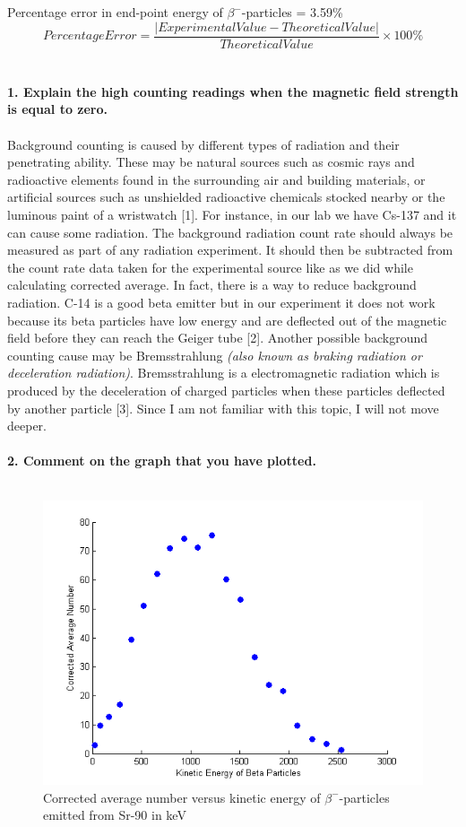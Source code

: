 \documentclass[a4paper,12pt]{article}
\begin{document}
Percentage error in end-point energy of $\beta^{-}$-particles = 3.59\% \\
\begin{equation}
Percentage Error=\frac{|Experimental Value-Theoretical Value|}{Theoretical Value}\times 100\%
\end{equation}\\\\
\textbf{1. Explain the high counting readings when the magnetic field strength is equal to zero.}\\\\
Background counting is caused by different types of radiation and their penetrating ability. These may be natural sources such as cosmic rays and
radioactive elements found in the surrounding air and building materials, or
artificial sources such as unshielded radioactive chemicals stocked nearby or the
luminous paint of a wristwatch [1]. For instance, in our lab we have Cs-137 and it can cause some radiation. The background radiation count rate should always
be measured as part of any radiation experiment. It should then be subtracted from
the count rate data taken for the experimental source like as we did while calculating corrected average. In fact, there is a way to reduce background radiation. C-14  is a good beta emitter but in our experiment it does not work because its beta
particles have low energy and are deflected out of the magnetic field before
they can reach the Geiger tube [2].
\newpage
Another possible background counting cause may be Bremsstrahlung \textit{(also known as braking radiation or deceleration radiation)}. Bremsstrahlung is a electromagnetic radiation which is produced by the deceleration of charged particles when these particles deflected by another particle [3]. Since I am not familiar with this topic, I will not move deeper.\\\\
\textbf{2. Comment on the graph that you have plotted.}\\\\
\begin{figure}[h!]
\centering
\includegraphics[width=0.7\linewidth, height=0.35\textheight]{g1}
\caption{Corrected average number versus kinetic energy of $\beta^{-}$-particles emitted from Sr-90 in keV}
\label{fig:g1}
\end{figure}
\end{document}
